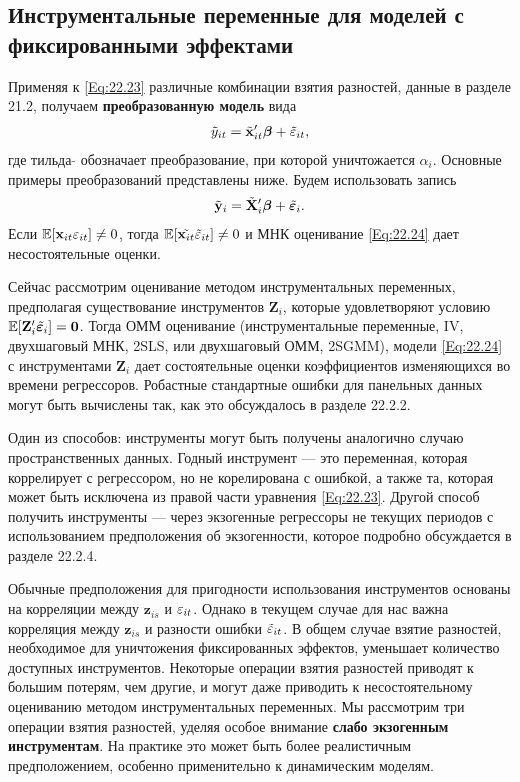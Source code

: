 \subsection{Инструментальные переменные для моделей с фиксированными эффектами}

Применяя к \ref{Eq:22.23} различные комбинации взятия разностей, данные в разделе 21.2, получаем \textbf{преобразованную модель} вида
\begin{align}
\tilde{y}_{it}= \tilde{\mathbf{x}}'_{it}\bm{\beta}+\tilde{\varepsilon}_{it},
\nonumber
\end{align}
где тильда $\tilde{}$  обозначает преобразование, при которой уничтожается $\alpha_i$. Основные примеры преобразований представлены ниже. Будем использовать запись
\begin{align}
\tilde{\mathbf y}_{i}= \tilde{\mathbf X}'_{i}\bm{\beta}+\tilde{\bm{\varepsilon}}_{i}.
\label{Eq:22.24}
\end{align}
Если $\mathbb{E}[\mathbf{x}_{it} \varepsilon_{it}] \neq 0$, тогда $\mathbb{E}[\tilde{\mathbf{x}_{it}} \tilde{\varepsilon}_{it}] \neq 0$ и МНК оценивание \ref{Eq:22.24} дает несостоятельные оценки.

Сейчас рассмотрим оценивание методом инструментальных переменных, предполагая существование инструментов $\mathbf Z_i$, которые удовлетворяют  условию $\mathbb{E} [\mathbf Z'_i \tilde{\bm{\varepsilon}}_i]=\mathbf 0$. Тогда ОММ оценивание (инструментальные переменные, IV, двухшаговый МНК, 2SLS, или двухшаговый ОММ, 2SGMM), модели \ref{Eq:22.24} с инструментами $\mathbf Z_i$ дает состоятельные оценки коэффициентов изменяющихся во времени регрессоров. Робастные стандартные ошибки для панельных данных могут быть вычислены так, как это обсуждалось в разделе 22.2.2.

Один из способов: инструменты могут быть получены аналогично случаю пространственных данных. Годный инструмент --- это переменная, которая коррелирует с регрессором, но не корелирована с ошибкой,  а также та, которая может быть исключена из правой части уравнения \ref{Eq:22.23}. Другой способ получить инструменты — через экзогенные регрессоры не текущих периодов с использованием предположения об экзогенности, которое подробно обсуждается в разделе 22.2.4.

Обычные предположения для пригодности использования инструментов основаны на корреляции между $\mathbf z_{is}$ и $\varepsilon_{it}$. Однако в текущем случае для нас важна корреляция между $\mathbf z_{is}$ и разности ошибки $\tilde {\varepsilon}_{it}$. В общем случае взятие разностей, необходимое для уничтожения фиксированных эффектов, уменьшает количество доступных инструментов. Некоторые операции взятия разностей  приводят к большим потерям, чем другие, и могут даже приводить к несостоятельному оцениванию методом инструментальных переменных. Мы рассмотрим три операции взятия разностей, уделяя особое внимание \textbf{слабо экзогенным инструментам}. На практике это может быть более реалистичным предположением, особенно применительно к динамическим моделям.

